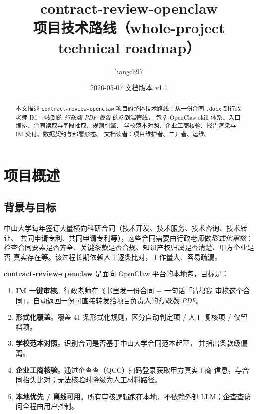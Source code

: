 \documentclass[11pt,a4paper]{article}
\title{\vspace{-1.4cm}\textbf{contract-review-openclaw}\\[2pt]
  \large 项目技术路线（whole-project technical roadmap）}
\author{liangch97}
\date{2026-05-07 \quad 文档版本 v1.1}
\begin{document}
\maketitle
\thispagestyle{fancy}

\begin{abstract}\noindent
本文描述 \texttt{contract-review-openclaw} 项目的整体技术路线：从一份合同
\texttt{.docx} 到行政老师 IM 中收到的 \emph{行政版 PDF 报告} 的端到端管线，
包括 OpenClaw skill 体系、入口编排、合同读取与字段抽取、规则引擎、
学校范本对照、企业工商核验、报告渲染与 IM 交付、数据契约与部署形态。
文档读者：项目维护者、二开者、运维。
\end{abstract}

\tableofcontents
\vspace{0.5em}

\section{项目概述}

\subsection{背景与目标}

中山大学每年签订大量横向科研合同（技术开发、技术服务、技术咨询、技术转让、
共同申请专利、共同申请专利等），这些合同需要由行政老师做\emph{形式化审核}：
检查合同要素是否齐全、关键条款是否合规、知识产权归属是否清楚、甲方企业是否
真实存在等。该过程长期依赖人工逐条比对，工作量大、容易疏漏。

\textbf{contract-review-openclaw} 是面向 OpenClaw 平台的本地包，目标是：

\begin{enumerate}[leftmargin=1.4em,itemsep=2pt]
  \item \textbf{IM 一键审核}。行政老师在飞书里发一份合同 + 一句话「请帮我
    审核这个合同」，自动返回一份可直接转发给项目负责人的\emph{行政版 PDF}。
  \item \textbf{形式化覆盖}。覆盖 41 条形式化规则，区分自动判定项 / 人工
    复核项 / 仅留档项。
  \item \textbf{学校范本对照}。识别合同是否基于中山大学合同范本起草，
    并指出条款级偏离。
  \item \textbf{企业工商核验}。通过企查查（QCC）扫码登录获取甲方真实工商
    信息，与合同抬头比对；无法核验时降级为人工材料路径。
  \item \textbf{本地优先 / 离线可用}。所有审核逻辑跑在本地，不依赖外部
    LLM；企查查访问全程由用户控制。
\end{enumerate}
\end{document}
